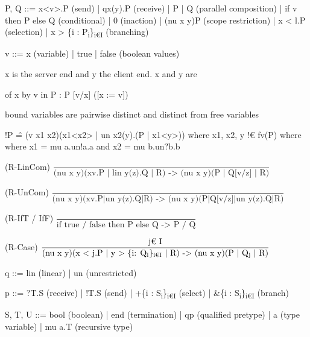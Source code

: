 \documentclass[landscape, a4paper]{article}
\begin{document}
\begin{minipage}[t]{0.19\linewidth}
	\raggedright

	\begin{betterlist}
		\item {} P, Q ::= x<v>.P (send) | qx(y).P (receive) | P | Q (parallel composition) | if v then P else Q (conditional) | 0 (inaction) | (nu x y)P (scope restriction) | x < l.P (selection) | x > \{i : P\textsubscript{i}\}\textsubscript{i€I} (branching)
		\item {} v ::= x (variable) | true | false (boolean values)
		\item x is the server end and y the client end. x and y are 
		\begin{betterlist}
			\item {} of x by v in P : P [v/x] ([x := v])
			\item {} bound variables are pairwise distinct and distinct from free variables
			\item !P \^= (v x1 x2)(x1<x2> | un x2(y).(P | x1<y>)) where x1, x2, y !€ fv(P) where where x1 = mu a.un!a.a and x2 = mu b.un?b.b
		\end{betterlist}
		\item \nul{Reduction rules (P -> P):}
		\begin{betterlist}
			\item (R-LinCom) $\dfrac{}{\text{(nu x y)(xv.P | lin y(z).Q | R) -> (nu x y)(P | Q[v/z] | R)}}$
			\item (R-UnCom) $\dfrac{}{\text{(nu x y)(xv.P|un y(z).Q|R) -> (nu x y)(P|Q[v/z]|un y(z).Q|R)}}$
			\item (R-IfT / IfF) $\dfrac{}{\text{if true / false then P else Q -> P / Q}}$
			\item (R-Case) $\dfrac{\text{j€ I}}{\text{(nu x y)(x < j.P | y > \{i: Q\textsubscript{i}\}\textsubscript{i€I} | R) -> (nu x y)(P | Q\textsubscript{j} | R)}}$
		\end{betterlist}
		\item \nul{Types:}
		\begin{betterlist}
			\item {} q ::= lin (linear) | un (unrestricted)
			\item {} p ::= ?T.S (receive) | !T.S (send) | +\{i : S\textsubscript{i}\}\textsubscript{i€I} (select) | \&\{i : S\textsubscript{i}\}\textsubscript{i€I} (branch)
			\item {} S, T, U ::= bool (boolean) | end (termination) | qp (qualified pretype) | a (type variable) | mu a.T (recursive type)

\end{betterlist}
\end{betterlist}
\end{minipage}
\end{document}
